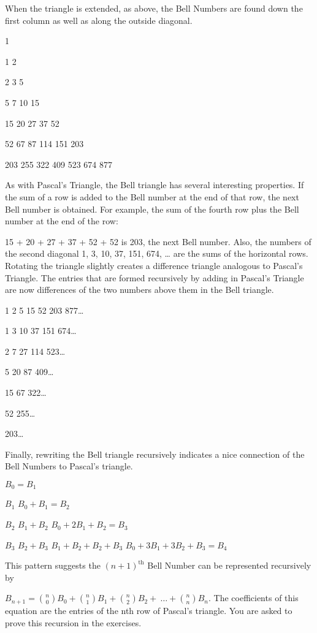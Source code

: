When the triangle is extended, as above, the Bell Numbers are found down
the first column as well as along the outside diagonal.

1

1 2

2 3 5

5 7 10 15

15 20 27 37 52

52 67 87 114 151 203

203 255 322 409 523 674 877

As with Pascal's Triangle, the Bell triangle has several interesting
properties. If the sum of a row is added to the Bell number at the end
of that row, the next Bell number is obtained. For example, the sum of
the fourth row plus the Bell number at the end of the row:

15 + 20 + 27 + 37 + 52 + 52 is 203, the next Bell number. Also, the
numbers of the second diagonal 1, 3, 10, 37, 151, 674, \ldots{} are the
sums of the horizontal rows. Rotating the triangle slightly creates a
difference triangle analogous to Pascal's Triangle. The entries that are
formed recursively by adding in Pascal's Triangle are now differences of
the two numbers above them in the Bell triangle.

1 2 5 15 52 203 877\ldots{}

1 3 10 37 151 674\ldots{}

2 7 27 114 523\ldots{}

5 20 87 409\ldots{}

15 67 322\ldots{}

52 255\ldots{}

203\ldots{}

Finally, rewriting the Bell triangle recursively indicates a nice
connection of the Bell Numbers to Pascal's triangle.

\(B_{0} = B_{1}\)

\(B_{1}\) \(B_{0} + B_{1} = B_{2}\)

\(B_{2}\) \(B_{1} + B_{2}\) \(B_{0} + 2B_{1} + B_{2} = B_{3}\)

\(B_{3}\) \(B_{2} + B_{3}\) \(B_{1} + B_{2} + B_{2} + B_{3}\)
\(B_{0} + 3B_{1} + 3B_{2} + B_{3} = B_{4}\)

This pattern suggests the \({(n + 1)}^{\text{th}}\) Bell Number can be
represented recursively by

\(B_{n + 1} =
\binom{n}{0}
B_{0} +
\binom{n}{1}
B_{1} +
\binom{n}{2}
B_{2} + \ \ldots +
\binom{n}{n}
B_{n}\). The coefficients of this equation are the entries
of the nth row of Pascal's triangle. You are asked to prove this
recursion in the exercises.

